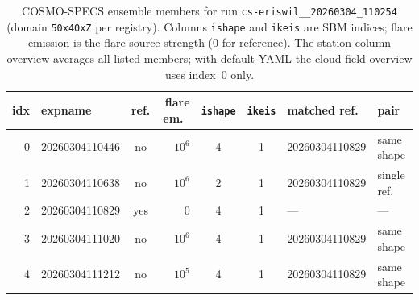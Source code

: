
\begin{table}[t]
  \centering
  \small
  \caption{COSMO-SPECS ensemble members for run \texttt{cs-eriswil\_\_20260304\_110254} (domain \texttt{50x40xZ} per registry). Columns \texttt{ishape} and \texttt{ikeis} are SBM indices; flare emission is the flare source strength (0 for reference). The station-column overview averages all listed members; with default YAML the cloud-field overview uses index~0 only.}
  \label{tab:ensemble_cs_eriswil_20260304_110254}
  \begin{tabular}{@{}r l c r c c l l@{}}
    \toprule
    idx & expname & ref. & flare em.\ & \texttt{ishape} & \texttt{ikeis} & matched ref.\ & pair \\
    \midrule
    0 & 20260304110446 & no & $10^{6}$ & 4 & 1 & 20260304110829 & same shape \\
    1 & 20260304110638 & no & $10^{6}$ & 2 & 1 & 20260304110829 & single ref. \\
    2 & 20260304110829 & yes & 0 & 4 & 1 & --- & --- \\
    3 & 20260304111020 & no & $10^{6}$ & 4 & 1 & 20260304110829 & same shape \\
    4 & 20260304111212 & no & $10^{5}$ & 4 & 1 & 20260304110829 & same shape \\
    \bottomrule
  \end{tabular}
\end{table}
